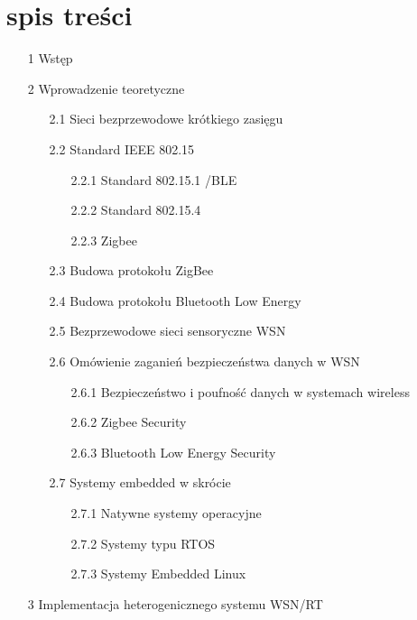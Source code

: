
\section*{spis treści}

\begin{itemize}
            \item [1] Wstęp
            \item [2] Wprowadzenie teoretyczne
            \begin{itemize}
            		\item [2.1] Sieci bezprzewodowe krótkiego zasięgu
            		\item [2.2] Standard IEEE 802.15
            		\begin{itemize}
            			\item [2.2.1] Standard 802.15.1 /BLE
        				\item [2.2.2] Standard 802.15.4
        				\item [2.2.3] Zigbee
            		\end{itemize}
            		\item [2.3] Budowa protokołu ZigBee
            		\item [2.4] Budowa protokołu Bluetooth Low Energy
            		\item [2.5] Bezprzewodowe sieci sensoryczne WSN
            		\item [2.6] Omówienie zaganień bezpieczeństwa danych w WSN
            		\begin{itemize}
            			\item [2.6.1] Bezpieczeństwo i poufność danych w systemach wireless
            			\item [2.6.2] Zigbee Security
            			\item [2.6.3] Bluetooth Low Energy Security
            		\end{itemize}
            		\item [2.7] Systemy embedded w skrócie
            		\begin{itemize}
            			\item [2.7.1] Natywne systemy operacyjne
            			\item [2.7.2] Systemy typu RTOS
        				\item [2.7.3] Systemy Embedded Linux
            		\end{itemize}
            \end{itemize}
            \item [3] Implementacja heterogenicznego systemu WSN/RT

\end{itemize}
